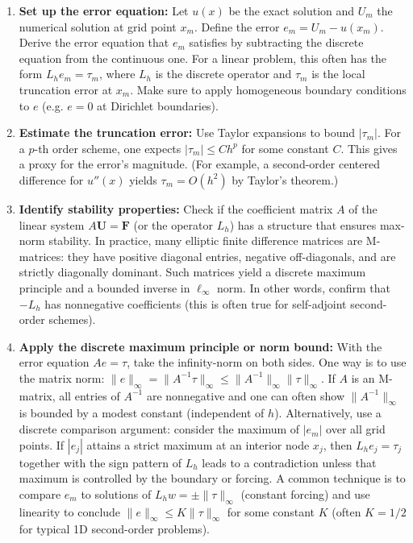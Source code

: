 \documentclass[a4paper,11pt]{article}
\begin{document}
\begin{enumerate}
    \item \textbf{Set up the error equation:} Let $u(x)$ be the exact solution and $U_m$ the numerical solution at grid point $x_m$. Define the error $e_m = U_m - u(x_m)$. Derive the error equation that $e_m$ satisfies by subtracting the discrete equation from the continuous one. For a linear problem, this often has the form $L_h e_m = \tau_m$, where $L_h$ is the discrete operator and $\tau_m$ is the local truncation error at $x_m$. Make sure to apply homogeneous boundary conditions to $e$ (e.g. $e=0$ at Dirichlet boundaries).

    \item \textbf{Estimate the truncation error:} Use Taylor expansions to bound $|\tau_m|$. For a $p$-th order scheme, one expects $|\tau_m| \leq Ch^p$ for some constant $C$. This gives a proxy for the error's magnitude. (For example, a second-order centered difference for $u''(x)$ yields $\tau_m = O(h^2)$ by Taylor's theorem.)

    \item \textbf{Identify stability properties:} Check if the coefficient matrix $A$ of the linear system $A \mathbf{U} = \mathbf{F}$ (or the operator $L_h$) has a structure that ensures max-norm stability. In practice, many elliptic finite difference matrices are M-matrices: they have positive diagonal entries, negative off-diagonals, and are strictly diagonally dominant. Such matrices yield a discrete maximum principle and a bounded inverse in $\ell_\infty$ norm. In other words, confirm that $-L_h$ has nonnegative coefficients (this is often true for self-adjoint second-order schemes).

    \item \textbf{Apply the discrete maximum principle or norm bound:} With the error equation $A e = \tau$, take the infinity-norm on both sides. One way is to use the matrix norm: $\|e\|_\infty = \|A^{-1}\tau\|_\infty \leq \|A^{-1}\|_\infty \|\tau\|_\infty$. If $A$ is an M-matrix, all entries of $A^{-1}$ are nonnegative and one can often show $\|A^{-1}\|_\infty$ is bounded by a modest constant (independent of $h$). Alternatively, use a discrete comparison argument: consider the maximum of $|e_m|$ over all grid points. If $|e_j|$ attains a strict maximum at an interior node $x_j$, then $L_h e_j = \tau_j$ together with the sign pattern of $L_h$ leads to a contradiction unless that maximum is controlled by the boundary or forcing. A common technique is to compare $e_m$ to solutions of $L_h w = \pm \|\tau\|_\infty$ (constant forcing) and use linearity to conclude $\|e\|_\infty \leq K\|\tau\|_\infty$ for some constant $K$ (often $K=1/2$ for typical 1D second-order problems).


\end{enumerate}
\end{document}
